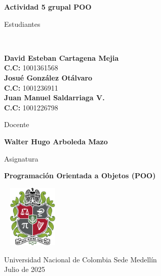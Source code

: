\begin{titlepage}
	\Large{
	\begin{center}
		\vspace*{0.9cm}
 
		\textbf{Actividad 5 grupal POO}
 
			 
		\vspace{0.5cm}
		
		Estudiantes
		
		\vspace{0.2cm}
		 \

 
		\textbf{David Esteban Cartagena Mejia} \\
		  \textbf{C.C:} 1001361568 \\	

		\textbf{Josué González Otálvaro} \\
		  \textbf{C.C:} 1001236911 \\	  		 

		 \textbf{Juan Manuel Saldarriaga V.} \\
		  \textbf{C.C:} 1001226798 \\
		  
	 
 
	   \vspace{0.2cm}
		
		Docente 
		
		\vspace{0.2cm}
 
		\textbf{Walter Hugo Arboleda Mazo}
		\vspace{1cm}
		
		Asignatura
		
		\vspace{0.5cm}
 
		\textbf{Programación Orientada a Objetos (POO)}
 
		\vfill
 
		\includegraphics[width=3cm,height=3cm]{logo.png}\\[0.2cm]
	  
		\vspace{0.2cm}
	  
				 
		Universidad Nacional de Colombia Sede Medellín\\
		Julio de 2025
		
	\end{center}
	}
 \end{titlepage}